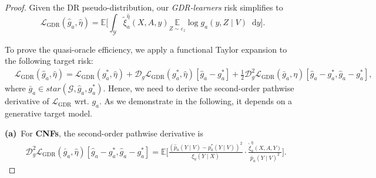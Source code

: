 \documentclass[dvipsnames]{article} %
\newcommand*\diff{\mathop{}\!\mathrm{d}}
\newcommand{\GDRlearners}{\emph{GDR-learners}\xspace}
\begin{document}
\begin{proof}
    Given the DR pseudo-distribution, our \GDRlearners risk simplifies to
    \begingroup\makeatletter\def\f@size{9}\check@mathfonts
    \begin{equation}
        \mathcal{L}_\text{{GDR}}(\hat{g}_a, \hat{\eta}) = \mathbb{E} \bigg[\int_{\mathcal{Y}}\tilde{\xi}^{\hat{\eta}}_a(X, A, y) \underset{Z \sim \varepsilon_z }{\mathbb{E}} \log g_a(y, Z \mid V) \diff y \bigg].
    \end{equation}
    \endgroup
    
    To prove the quasi-oracle efficiency, we apply a functional Taylor expansion to the following target risk:
    \begingroup\makeatletter\def\f@size{9}\check@mathfonts
    \begin{align} \label{eq:dist-taylor}
        &\mathcal{L}_\text{{GDR}}(\hat{g}_a, \hat{\eta}) = \mathcal{L}_\text{{GDR}}({g}_a^*, \hat{\eta}) + \mathcal{D}_g\mathcal{L}_\text{{GDR}}({g}_a^*, \hat{\eta})[\hat{g}_a - g_a^*] + \frac{1}{2} \mathcal{D}_g^2\mathcal{L}_\text{{GDR}}(\bar{g}_a, \eta)[\hat{g}_a - g_a^*, \hat{g}_a - g_a^*],
    \end{align}
    \endgroup
    where $\bar{g}_a \in star(\mathcal{G}, \hat{g}_a, g_a^*)$. Hence, we need to derive the second-order pathwise derivative of $\mathcal{L}_\text{{GDR}}$ wrt. $g_a$. As we demonstrate in the following, it depends on a generative target model.


    \textbf{(a)}~For \textbf{CNFs},  the second-order pathwise derivative is
    \begingroup\makeatletter\def\f@size{9}\check@mathfonts
    \begin{align}
        & \mathcal{D}_g^2\mathcal{L}_\text{{GDR}}(\bar{g}_a, \hat{\eta})[\hat{g}_a - g_a^*, \hat{g}_a - g_a^*]
        = \mathbb{E}\Bigg[\frac{(\hat{p}_a(Y \mid V) - p_a^*(Y \mid V))^2}{\xi_a(Y \mid X)} \cdot \frac{\tilde{\xi}^{\hat{\eta}}_a(X, A, Y)}{\bar{p}_a(Y \mid V)^2}  \Bigg].
    \end{align}
    \endgroup


\end{proof}
\end{document}
